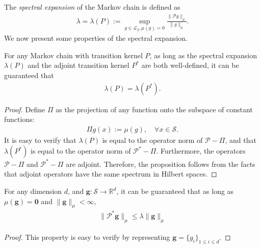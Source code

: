 The \emph{spectral expansion} of the Markov chain is defined as
\begin{align*}
\lambda = \lambda(P):= \sup_{g \in \mathcal{L}_2,\mu(g) = 0} \frac{\|\mathcal{P} g\|_{\mu}}{\|g\|_{\mu}}.
\end{align*}
We now present some properties of the spectral expansion.

\begin{customproposition}\label{prop:adjoint-spectral}
For any Markov chain with transition kernel $P$, as long as the spectral expansion $\lambda(P)$ and the adjoint transition kernel $P^*$ are both well-defined, it can be guaranteed that
\begin{align*}
\lambda(P) = \lambda(P^*).
\end{align*}
\end{customproposition}
\begin{proof}
Define $\Pi$ as the projection of any function onto the subspace of constant functions:
\begin{align*}
\Pi g(x):= \mu(g), \quad \forall x\in \mathcal{S}.
\end{align*}
It is easy to verify that $\lambda(P)$ is equal to the operator norm of $\mathcal{P}-\Pi$, and that $\lambda(P^*)$ is equal to the operator norm of $\mathcal{P}^* - \Pi$. Furthermore, the operators $\mathcal{P}-\Pi$ and $\mathcal{P}^* - \Pi$ are adjoint. Therefore, the proposition follows from the facts that adjoint operators have the same spectrum in Hilbert spaces. 
\end{proof}

\begin{customproposition}\label{prop:spectral-expansion}
For any dimension $d$, and $\bm{g}:\mathcal{S} \to \mathbb{R}^d$, it can be guaranteed that as long as $\mu(\bm{g}) = \bm{0}$ and $\|\bm{g}\|_{\mu} < \infty$,
\begin{align*}
\|\mathcal{P}^*\bm{g}\|_{\mu} \leq \lambda \|\bm{g}\|_{\mu}
\end{align*}
\end{customproposition}
\begin{proof}
This property is easy to verify by representing $\bm{g} = \{g_{i}\}_{1 \leq i\leq d}$. 
\end{proof}

